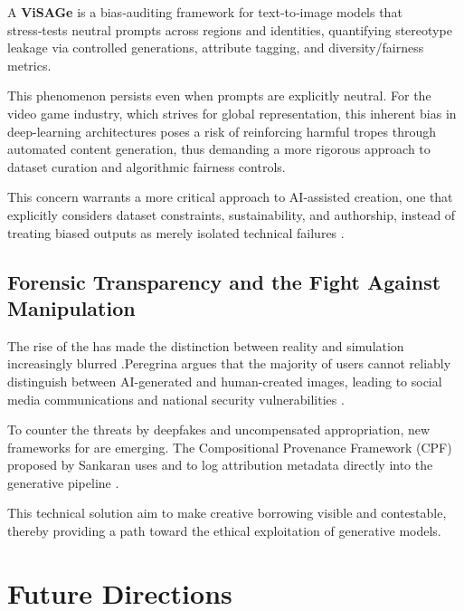 \documentclass[9pt,a4paper,twocolumn,twoside]{rho-class/rho}
\begin{document}
        \begin{note}
            A \textbf{ViSAGe} is a bias‑auditing framework for text‑to‑image models that stress‑tests neutral prompts across regions and identities, quantifying stereotype leakage via controlled generations, attribute tagging, and diversity/fairness metrics.
        \end{note}

        This phenomenon persists even when prompts are explicitly neutral. For the video game industry, which strives for global representation, this inherent bias in deep-learning architectures poses a risk of reinforcing harmful tropes through automated content generation, thus demanding a more rigorous approach to dataset curation and algorithmic fairness controls. 

        This concern warrants a more critical approach to AI-assisted creation, one that explicitly considers dataset constraints, sustainability, and authorship, instead of treating biased outputs as merely isolated technical failures \cite{condorelli}.

	\subsection{Forensic Transparency and the Fight Against Manipulation}

        The rise of the  has made the distinction between reality and simulation increasingly blurred \cite{peregrina}.Peregrina argues that the majority of users cannot reliably distinguish between AI-generated and human-created images, leading to social media communications and national security vulnerabilities \cite{peregrina}. 
        
        To counter the threats by deepfakes and uncompensated appropriation, new frameworks for  are emerging. The Compositional Provenance Framework (CPF) proposed by Sankaran uses  and  to log attribution metadata directly into the generative pipeline \cite{sankaran}. 
        
        This technical solution aim to make creative borrowing visible and contestable, thereby providing a path toward the ethical exploitation of generative models.

\section{Future Directions}
\end{document}
